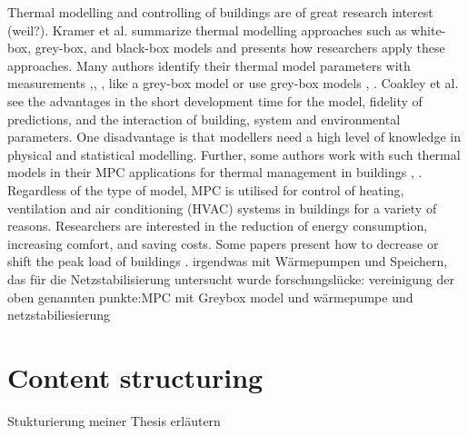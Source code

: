 Thermal modelling and controlling of buildings are of great research interest  (weil?). Kramer et al. 
\cite{Kramer.2012}
summarize thermal modelling approaches such as white-box, grey-box, and black-box models and presents how researchers apply these approaches. Many authors identify their thermal model parameters with measurements \cite{Siroky.2011},\cite{Hazyuk.2012}, \cite{Park.2011}, like a grey-box model or use grey-box models \cite{Freund.2020}, \cite{EvelynSperber.2019}. Coakley et al. \cite{Coakley.2014} see the advantages in the short development time for the model, fidelity of predictions, and the interaction of building, system and environmental parameters. One disadvantage is that modellers need a high level of knowledge in physical and statistical modelling.
Further, some authors work with such thermal models in their MPC applications for thermal management in buildings \cite{JiriCigler.}, \cite{Hazyuk.2012b}.
\newline
Regardless of the type of model, MPC is utilised for control of heating, ventilation and air conditioning (HVAC) systems in buildings for a variety of reasons. Researchers are interested in the reduction of energy consumption, increasing comfort, and saving costs. Some papers present how to decrease or shift the peak load of buildings \cite{Oldewurtel.2010}.
\newline
irgendwas mit Wärmepumpen und Speichern, das für die Netzstabilisierung untersucht wurde
\newline
forschungslücke: vereinigung der oben genannten punkte:MPC mit Greybox model und wärmepumpe und netzstabiliesierung 




\section{Content structuring}
\label{section:contentstructuring}
Stukturierung meiner Thesis erläutern